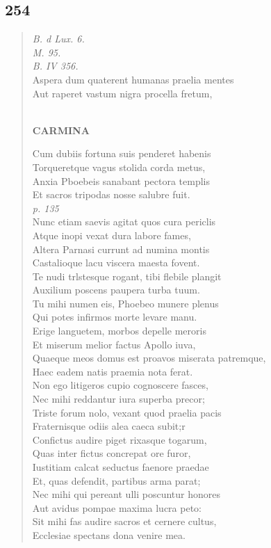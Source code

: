 \documentclass[11pt, a4paper]{report}
\begin{document}
            \subsection*{254}
      \begin{verse}
      \textit{B. d Lux. 6.} \\ \textit{M. 95.} \\ \textit{B. IV 356.} \\ Aspera dum quaterent humanas praelia mentes \\ Aut raperet vastum nigra procella fretum, \\ 
        ﻿\pagebreak 
    \begin{center} \textbf{CARMINA} \end{center} \marginpar{[210]} Cum dubiis fortuna suis penderet habenis \\ Torqueretque vagus stolida corda metus, \\ Anxia Pboebeis sanabant pectora templis \\ Et sacros tripodas nosse salubre fuit. \\ \textit{p. 135} \\ Nunc etiam saevis agitat quos cura periclis \\ Atque inopi vexat dura labore fames, \\ Altera Parnasi currunt ad numina montis \\ Castalioque lacu viscera maesta fovent. \\ Te nudi trlstesque rogant, tibi flebile plangit \\ Auxilium poscens paupera turba tuum. \\ Tu mihi numen eis, Phoebeo munere plenus \\ Qui potes infirmos morte levare manu. \\ Erige languetem, morbos depelle meroris \\ Et miserum melior factus Apollo iuva, \\ Quaeque meos domus est proavos miserata patremque, \\ Haec eadem natis praemia nota ferat. \\ Non ego litigeros cupio cognoscere fasces, \\ Nec mihi reddantur iura superba precor; \\ Triste forum nolo, vexant quod praelia pacis \\ Fraternisque odiis alea caeca subit;r \\ Confictus audire piget rixasque togarum, \\ Quas inter fictus concrepat ore furor, \\ Iustitiam calcat seductus faenore praedae \\ Et, quas defendit, partibus arma parat; \\ Nec mihi qui pereant ulli poscuntur honores \\ Aut avidus pompae maxima lucra peto: \\ Sit mihi fas audire sacros et cernere cultus, \\ Ecclesiae spectans dona venire mea. \\ 

\end{verse}
\end{document}

